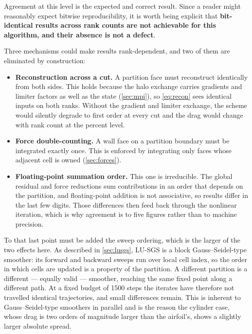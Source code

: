 Agreement at this level is the expected and correct result. Since a reader might
reasonably expect bitwise reproducibility, it is worth being explicit that
\textbf{bit-identical results across rank counts are not achievable for this
algorithm, and their absence is not a defect}.

Three mechanisms could make results rank-dependent, and two of them are
eliminated by construction:

\begin{itemize}
  \item \textbf{Reconstruction across a cut.} A partition face must reconstruct
  identically from both sides. This holds because the halo exchange carries
  gradients and limiter factors as well as the state (\cref{sec:mpi}), so
  \cref{eq:recon} sees identical inputs on both ranks. Without the gradient and
  limiter exchange, the scheme would silently degrade to first order at every cut
  and the drag would change with rank count at the percent level.
  \item \textbf{Force double-counting.} A wall face on a partition boundary must
  be integrated exactly once. This is enforced by integrating only faces whose
  adjacent cell is owned (\cref{sec:forces}).
  \item \textbf{Floating-point summation order.} This one is irreducible. The
  global residual and force reductions sum contributions in an order that depends
  on the partition, and floating-point addition is not associative, so results
  differ in the last few digits. Those differences then feed back through the
  nonlinear iteration, which is why agreement is to five figures rather than to
  machine precision.
\end{itemize}

To that last point must be added the sweep ordering, which is the larger of the
two effects here. As described in \cref{sec:lusgs}, LU-SGS is a block
Gauss--Seidel-type smoother: its forward and backward sweeps run over local cell
index, so the order in which cells are updated is a property of the partition. A
different partition is a different --- equally valid --- smoother, reaching the same
fixed point along a different path. At a fixed budget of 1500 steps the iterates
have therefore not travelled identical trajectories, and small differences remain.
This is inherent to Gauss--Seidel-type smoothers in parallel and is the reason the
cylinder case, whose drag is two orders of magnitude larger than the airfoil's,
shows a slightly larger absolute spread.

